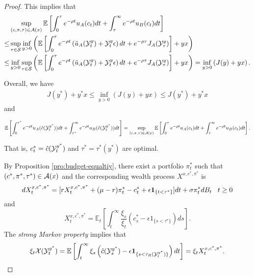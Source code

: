 \documentclass[a4paper,report, 11pt]{article}
\def\e{\epsilon}
\def\m{\mu}
\def\s{\sigma}
\begin{document}
\begin{proof}
	This implies that 
	\begin{align*}
	&\sup_{(c,\pi,\tau)\in{\cal A}(x)} \mathbb{E}\left[\int_0^\tau e^{-\rho t} u_A(c_t)dt+\int_\tau^\infty e^{-\rho t}u_B(c_t)dt\right] \\
	\le&\sup_{\tau\in{\cal S}}\inf_{y>0}\left(\mathbb{E}\left[\int_0^\tau e^{-\rho t}\left(\tilde{u}_A({\cal Y}_t^y)+{\cal Y}_t^y \e\right)dt +e^{-\rho \tau}J_A({\cal Y}_{\tau}^y)\right]+yx\right)\\
	\le&\inf_{y>0}\sup_{\tau\in{\cal S}}\left(\mathbb{E}\left[\int_0^\tau e^{-\rho t}\left(\tilde{u}_A({\cal Y}_t^y)+{\cal Y}_t^y \e\right)dt +e^{-\rho \tau}J_A({\cal Y}_{\tau}^y)\right]+yx\right)=\inf_{y>0}\left(J(y)+yx\right).
	\end{align*}
	
	Overall, we have 
	\begin{align*}
	J(y^*) +y^*x\le \inf_{y>0}\left(J(y)+yx\right) \le J(y^*) +y^*x
	\end{align*}
	and  
	\begin{footnotesize}
		\begin{align*}
		\mathbb{E}\left[\int_0^{\tau^*} e^{-\rho t}u_A(\hat{c}({\cal Y}_t^{y^*}))dt+\int_{\tau^*}^\infty e^{-\rho t}u_B(\hat{c}({\cal Y}_t^{y^*}))dt\right]=\sup_{(c,\pi,\tau)\in{\cal A}(x)}\mathbb{E}\left[\int_0^\tau e^{-\rho t} u_A(c_t)dt+\int_\tau^\infty e^{-\rho t}u_B(c_t)dt\right].
		\end{align*}
	\end{footnotesize}
	
	That is, $c_t^*=\hat{c}({\cal Y}_t^{y^*})$ and $\tau^*=\tau^*(y^*)$ are optimal. 
	
	By Proposition \ref{pro:budget-equaltiy}, there exist a portfolio $\pi_t^*$ such that $(c^*,\pi^*,\tau^*)\in{\cal A}(x)$ and the corresponding wealth process $X^{x, c^*, \pi^*}$ is 
		\begin{equation}\label{eq:compare1}
		dX_t^{x,c^*,\pi^*} = [r X_t^{x,c^*,\pi^*} +(\m-r)\pi_t^* -c_t^* +\e{\bf 1}_{\{t<\tau^*\}}]dt +\s \pi_t^* dB_t \;\;\;t\ge 0
		\end{equation}
		and 
		\begin{equation*}
		X_t^{x,c^*,\pi^*} =\mathbb{E}_t\left[\int_t^\infty \dfrac{ \xi_s}{ \xi_t} (c_s^*-\e 1_{\{s<\tau^* \}})ds\right].
		\end{equation*} 
	The {\it strong Markov property} implies that 
    \begin{equation*}
    \xi_t{\cal X}({\cal Y}_t^{y^*})=\mathbb{E}\left[\int_t^{\infty}\xi_s\left(\hat{c}({\cal Y}_s^{y^*})-\e{\bf 1}_{\{s<\tau_R({\cal Y}_t^{y^*})\}}\right)dt\right]=\xi_t X_t^{x,c^*,\pi^*}.
    \end{equation*}
    

\end{proof}
\end{document}
